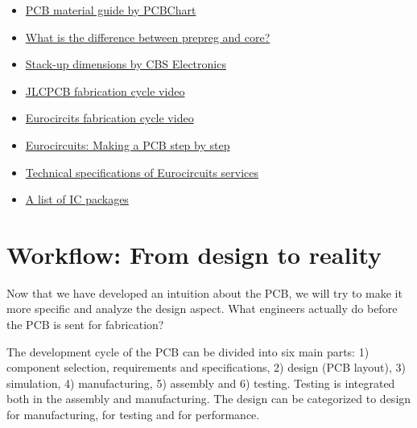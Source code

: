 \documentclass[final]{cubedoc}
\begin{document}
	\begin{itemize}
		\item \href{https://web.archive.org/web/20200814084633/https://www.pcbcart.com/pcb-capability/pcb-materials.html}{PCB material guide by PCBChart}
		\item \href{https://web.archive.org/web/20200814084719/https://electronics.stackexchange.com/questions/356063/what-exactly-is-prepreg-and-core-in-a-pcb}{What is the difference between prepreg and core?}
		\item \href{https://web.archive.org/web/20200814084757/https://www.cbspcb.com/pcboard-stackups/}{Stack-up dimensions by CBS Electronics} 
		\item \href{https://www.youtube.com/watch?v=ljOoGyCso8s&t=311s}{JLCPCB fabrication cycle video}
		\item \href{https://www.youtube.com/watch?v=sIV0icM_Ujo&t=436s}{Eurocircits fabrication cycle video}
		\item \href{https://web.archive.org/web/20200814085226/https://www.eurocircuits.com/making-a-pcb-pcb-manufacture-step-by-step/}{Eurocircuits: Making a PCB step by step}
		\item \href{https://web.archive.org/web/20200814085350/https://www.eurocircuits.com/technical-specifications-of-all-eurocircuits-prototype-small-volume-services-european-origin/}{Technical specifications of Eurocircuits services}    
		\item \href{https://web.archive.org/web/20200814085429/https://en.wikipedia.org/wiki/List_of_integrated_circuit_packaging_types}{A list of IC packages}
	\end{itemize}
	
	\section{Workflow: From design to reality} 
	
	Now that we have developed an intuition about the PCB, we will try to make it more specific and analyze the design aspect. What engineers actually do before the PCB is sent for fabrication?
	
	The development cycle of the PCB can be divided into six main parts: 1) component selection, requirements and specifications, 2) design (PCB layout), 3) simulation, 4) manufacturing, 5) assembly and 6) testing. Testing is integrated both in the assembly and manufacturing.
	The design can be categorized to design for manufacturing, for testing and for performance.  
	
\end{document}
